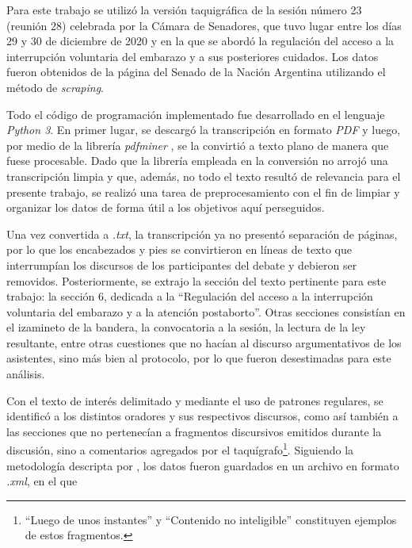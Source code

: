 Para este trabajo se utiliz\'o la versi\'on {taquigr\'afica} de la sesi\'on n\'umero
23 (reuni\'on 28) celebrada por la {C\'amara} de Senadores, que tuvo lugar entre los d\'ias
29 y 30 de diciembre de 2020 y en la que se abord\'o la
regulaci\'on del acceso a la interrupci\'on voluntaria del embarazo y a sus
posteriores cuidados. Los datos fueron obtenidos de la {p\'agina} del Senado de la Naci\'on
Argentina \citep{senado2020sesion}
utilizando el m\'etodo de \textit{scraping}.\par
Todo el c\'odigo de programaci\'on implementado fue desarrollado en el lenguaje
\textit{Python 3}. En primer lugar, se descarg\'o la transcripci\'on en formato \textit{PDF} y luego, por
medio de la librer\'ia \textit{pdfminer} \citep{shinyama2015pdfminer},
se la convirti\'o a texto plano de manera que fuese procesable. Dado que la librer\'ia
empleada en la conversi\'on no arroj\'o una transcripci\'on limpia y que, {adem\'as}, no todo el texto
result\'o de relevancia para el presente trabajo, se {realiz\'o} una tarea de
preprocesamiento con el fin de limpiar y organizar los datos de forma \'util a los
objetivos aqu\'i perseguidos.\par
Una vez convertida a \textit{.txt}, la transcripci\'on ya no present\'o separaci\'on de
{p\'aginas}, por lo que los encabezados y pies se convirtieron en l\'ineas de texto que
interrump\'ian los discursos de los participantes del debate y debieron
ser removidos.
Posteriormente, se extrajo la secci\'on del texto pertinente para este trabajo:
la secci\'on 6, dedicada a la ``Regulaci\'on  del  acceso  a  la  interrupci\'on
voluntaria  del  embarazo  y  a  la atenci\'on postaborto''. Otras secciones consist\'ian
en el izamineto de la bandera, la convocatoria a la sesi\'on, la lectura de la ley
resultante, entre otras cuestiones que no hac\'ian al discurso argumentativos de los
asistentes, sino {m\'as} bien al protocolo, por lo que fueron desestimadas
para este {an\'alisis}.\par
Con el texto de inter\'es delimitado y mediante el uso de patrones regulares, se
identific\'o a los distintos oradores y sus respectivos discursos, como as\'i tambi\'en
a las secciones que no pertenec\'ian a fragmentos discursivos emitidos durante la
discusi\'on, sino a comentarios agregados por el taqu\'igrafo\footnote{``Luego de unos
instantes'' y ``Contenido no inteligible'' constituyen ejemplos de estos
fragmentos.}. Siguiendo la metodolog\'ia descripta por \cite{monroe2008fightin},
los datos fueron guardados en un archivo en formato \textit{.xml}, en el que
